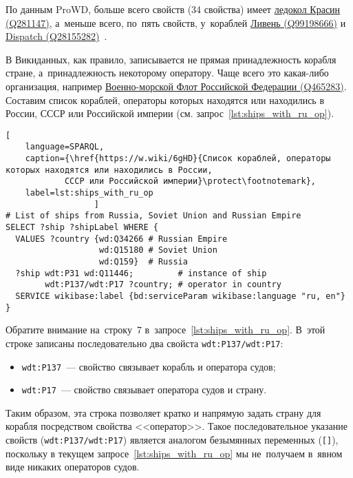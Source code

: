 \newpage
По данным ProWD, больше всего свойств (34 свойства) имеет 
\href{https://www.wikidata.org/wiki/Q281147}{ледокол Красин (Q281147)}, 
а~меньше всего, по~пять свойств, у~кораблей 
\href{https://www.wikidata.org/wiki/Q99198666}{Ливень (Q99198666)} и 
\href{https://www.wikidata.org/wiki/Q28155282}{Dispatch (Q28155282)}~\autocite{ProWD_ru_ships}.

В Викиданных, как правило, записывается не прямая принадлежность корабля стране, 
а~принадлежность некоторому оператору. 
Чаще всего это какая-либо организация, 
например 
\href{https://www.wikidata.org/wiki/Q465283}{Военно-морской Флот Российской Федерации (Q465283)}. 
Составим список кораблей, 
операторы которых находятся или находились в России, СССР или Российской империи 
(см. запрос~\ref{lst:ships_with_ru_op}). 



\begin{lstlisting}[ 
    language=SPARQL, 
    caption={\href{https://w.wiki/6gHD}{Cписок кораблей, операторы которых находятся или находились в России, 
            СССР или Российской империи}\protect\footnotemark}, 
    label=lst:ships_with_ru_op 
                  ]
# List of ships from Russia, Soviet Union and Russian Empire
SELECT ?ship ?shipLabel WHERE {
  VALUES ?country {wd:Q34266 # Russian Empire
                   wd:Q15180 # Soviet Union
                   wd:Q159}  # Russia
  ?ship wdt:P31 wd:Q11446;         # instance of ship
        wdt:P137/wdt:P17 ?country; # operator in country
  SERVICE wikibase:label {bd:serviceParam wikibase:language "ru, en"}
}
\end{lstlisting}

Обратите внимание на~строку~7 в~запросе~\ref{lst:ships_with_ru_op}. 
В~этой строке записаны последовательно два свойста \texttt{wdt:P137/wdt:P17}:
\begin{itemize}
	\item \texttt{wdt:P137}~--- свойство  связывает корабль и оператора судов;
	\item \texttt{wdt:P17}~--- свойство  связывает оператора судов и страну.
\end{itemize}
Таким образом, эта строка позволяет кратко и напрямую задать страну для корабля 
посредством свойства <<оператор>>. 
Такое последовательное указание свойств (\texttt{wdt:P137/wdt:P17}) 
является аналогом безымянных переменных (\lstinline|[]|),
поскольку в текущем запросе~\ref{lst:ships_with_ru_op} 
мы не~получаем в~явном виде никаких операторов судов. 




